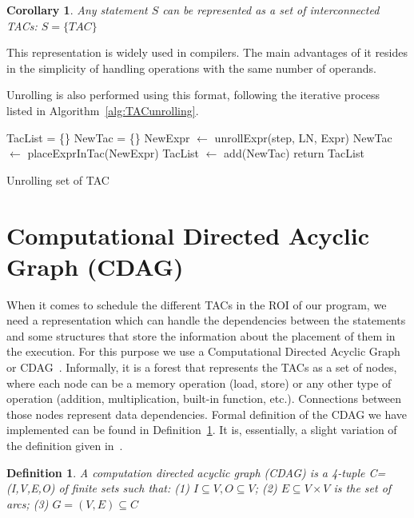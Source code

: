 \documentclass[a4paper,12pt]{memoir}
\newtheorem{definition}{Definition}[]
\newtheorem{corollary}{Corollary}[]
\begin{document}
\begin{corollary}\label{cor:TAC}
	Any statement $S$ can be represented as a set of interconnected TACs:
	$S = \{TAC\}$
\end{corollary}

This representation is widely used in compilers. The main advantages of it
resides in the simplicity of handling operations with the same number of
operands.

Unrolling is also performed using this format, following the iterative process
listed in
Algorithm~\ref{alg:TACunrolling}.

\begin{algorithm}[H]\label{alg:TACunrolling}
	\SetAlgoLined
	TacList = \{\}\;
	 {
		 {
			 {
				NewTac = \{\}\;
				 {
					NewExpr $\leftarrow$ unrollExpr(step, LN, Expr)\;
					NewTac $\leftarrow$ placeExprInTac(NewExpr)\;
				}
				TacList $\leftarrow$ add(NewTac)\;
			}
		}
	}
	return TacList\;
	\caption{Unrolling set of TAC}
\end{algorithm}


\section{Computational Directed Acyclic Graph (CDAG)}
When it comes to schedule the different TACs in the ROI of our program, we need
a representation which can handle the dependencies between the statements and
some structures that store the information about the placement of them in the
execution. For this purpose we use a Computational Directed Acyclic Graph or
CDAG~\cite{bib:CDAGdefinition}. Informally, it is a forest that represents the
TACs as a set of nodes, where
each node can be a memory operation (load, store) or any other type of
operation (addition, multiplication, built-in function, etc.). Connections
between those nodes represent data dependencies. Formal
definition of the CDAG we have implemented can be found in
Definition~\ref{def:CDAG}. It is, essentially, a slight variation
of the definition given in~\cite{bib:CDAGdefinition}.

\theoremstyle{definition}
\begin{definition}\label{def:CDAG}
	A computation directed acyclic graph (CDAG) is a 4-tuple C=(I,V,E,O) of
	finite sets such that: (1) $I \subseteq V, O \subseteq V$; (2) $E
		\subseteq V
		\times V$ is the set of arcs; (3) $G=(V,E) \subseteq C$
\end{definition}
\end{document}
